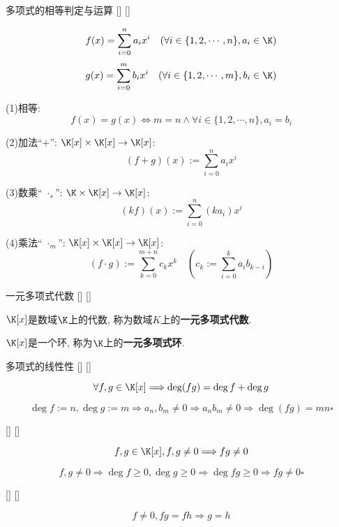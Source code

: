 \documentclass[UTF8]{ctexart}
\begin{document}
		\begin{dfn}
			[]
			{多项式的相等判定与运算}
			[]
			[]

			\[f(x)=\sum_{i=0}^n a_i x^i\quad(\forall i\in\{1,2,\cdots,n\}, a_i\in\K)\]
			\[g(x)=\sum_{i=0}^m b_i x^i\quad(\forall i\in\{1,2,\cdots,m\}, b_i\in\K)\]
			
			(1)相等: 
			\[f(x)=g(x)\iff m=n\wedge\forall i\in\{1,2,\cdots,n\}, a_i=b_i\]

			(2)加法``$+$'': $\K[x]\times\K[x]\to\K[x]$: 
			\[(f+g)(x):=\sum_{i=0}^n a_i x^i\]

			(3)数乘`` $\cdot_s$'': $\K\times\K[x]\to\K[x]$: 
			\[(kf)(x):=\sum_{i=0}^n (ka_i) x^i\]

			(4)乘法`` $\cdot_m$'': $\K[x]\times\K[x]\to\K[x]$: 
			\[(f\cdot g):=\sum_{k=0}^{m+n} c_k x^k\quad\left(c_k:=\sum_{i=0}^k a_i b_{k-i}\right)\]
		\end{dfn}
		
		\begin{ppt}
			[]
			{一元多项式代数}
			[]
			[]

			$\K[x]$是数域$\K$上的代数, 称为数域$K$上的\textbf{一元多项式代数}. 

			$\K[x]$是一个环, 称为$\K$上的\textbf{一元多项式环}. 
		\end{ppt}
		
		\begin{ppt}
			[]
			{多项式的线性性}
			[]
			[]

			\[\forall f,g\in\K[x]\Longrightarrow\deg(fg)=\deg f+\deg g\]
		\end{ppt}
  
        \begin{prf}
			\[\deg f:=n, \deg g:=m\Longrightarrow a_n, b_m\neq 0\Longrightarrow a_n b_m\neq 0\Longrightarrow\deg(fg)=mn\square\]
        \end{prf}
        
		\begin{ppt}
			[]
			{}
			[]
			[]

			\[f,g\in\K[x], f,g\neq 0\Longrightarrow fg\neq 0\]
		\end{ppt}
  
        \begin{prf}
			\[f,g\neq 0\Longrightarrow\deg f\geq 0, \deg g\geq 0\Longrightarrow \deg fg\geq 0\Longrightarrow fg\neq 0\square\]
        \end{prf}
        
		\begin{ppt}
			[]
			{}
			[]
			[]
			
			\[f\neq0, fg=fh\Longrightarrow g=h\]
		\end{ppt}
  
\end{document}
